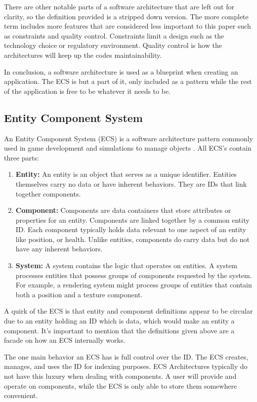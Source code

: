 There are other notable parts of a software architecture that are left out for clarity, so the definition provided is a stripped down version. The more complete term includes more features that are considered less important to this paper such as constraints and quality control. Constraints limit a design such as the technology choice or regulatory environment. Quality control is how the architectures will keep up the codes maintainability.

In conclusion, a software architecture is used as a blueprint when creating an application. The ECS is but a part of it, only included as a pattern while the rest of the application is free to be whatever it needs to be.

\subsection{Entity Component System}
An Entity Component System (ECS) is a software architecture pattern commonly used in game development and simulations to manage objects \cite{RomeoPHD}. All ECS's contain three parts:
\begin{enumerate}
    \item \textbf{Entity:} An entity is an object that serves as a unique identifier. Entities themselves carry no data or have inherent behaviors. They are IDs that link together components.
    \item \textbf{Component:} Components are data containers that store attributes or properties for an entity. Components are linked together by a common entity ID. Each component typically holds data relevant to one aspect of an entity like position, or health. Unlike entities, components do carry data but do not have any inherent behaviors.
    \item \textbf{System:} A system contains the logic that operates on entities. A system processes entities that possess groups of components requested by the system. For example, a rendering system might process groups of entities that contain both a position and a texture component. 
\end{enumerate}

A quirk of the ECS is that entity and component definitions appear to be circular due to an entity holding an ID which is data, which would make an entity a component. It's important to mention that the definitions given above are a facade on how an ECS internally works. 

The one main behavior an ECS has is full control over the ID. The ECS creates, manages, and uses the ID for indexing purposes. ECS Architectures typically do not have this luxury when dealing with components. A user will provide and operate on components, while the ECS is only able to store them somewhere convenient. 


